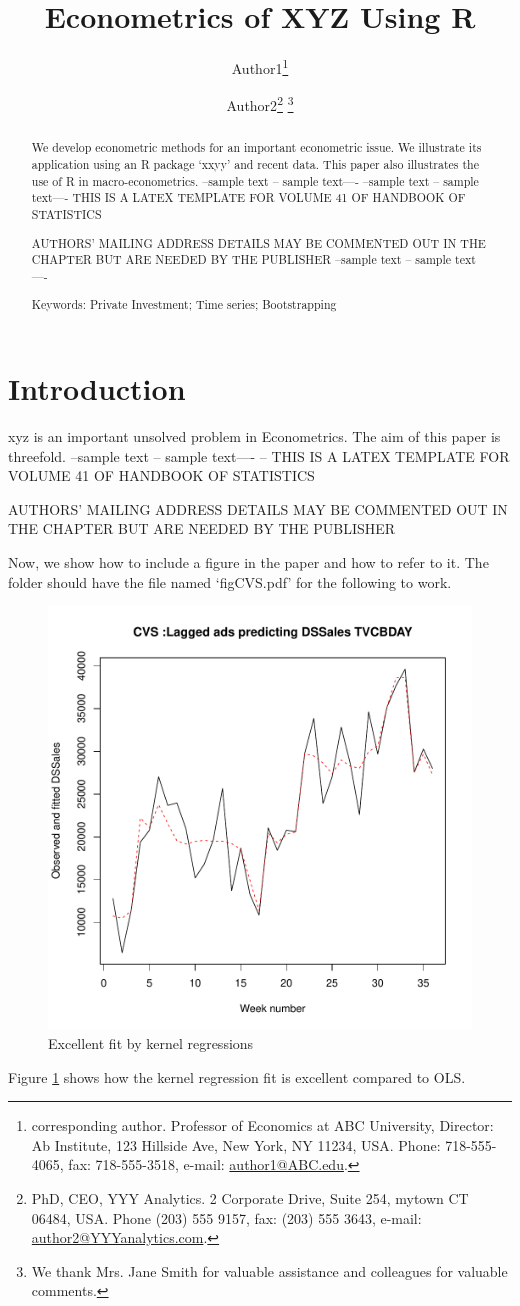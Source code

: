 \documentclass[12pt]{article}\usepackage[]{graphicx}\usepackage[]{color}
\title{Econometrics of XYZ Using R}
\author{ {Author1}\footnote{corresponding author. 
 Professor of Economics at ABC University, 
Director:  Ab Institute, 123 Hillside Ave, New York, NY 11234, USA. Phone: 718-555-4065, fax: 718-555-3518, e-mail: \url{author1@ABC.edu}.} 
\and 
{Author2}\footnote{PhD, CEO, YYY Analytics. 2 Corporate Drive, Suite 254, mytown CT 06484, USA. Phone (203) 555 9157, fax: (203) 555 3643, e-mail: \url{author2@YYYanalytics.com}.}
\thanks{We thank Mrs. Jane Smith for valuable assistance and colleagues for valuable comments.} 
} %
\begin{document}
\maketitle

\begin{abstract}
We develop econometric methods for an  important
econometric issue.
We illustrate its application using an R package `xxyy'
and recent data.
This paper also illustrates the use of R in macro-econometrics.
--sample text -- sample text----
--sample text -- sample text----
THIS IS A LATEX TEMPLATE FOR VOLUME 41 OF HANDBOOK OF STATISTICS


AUTHORS' MAILING ADDRESS DETAILS MAY BE COMMENTED OUT IN THE CHAPTER
 BUT ARE NEEDED BY THE PUBLISHER
 --sample text -- sample text----

\bigskip

Keywords: Private Investment; Time series; Bootstrapping


\end{abstract}

\section{Introduction}
xyz is an important unsolved problem in Econometrics.
The aim of this paper is threefold.
--sample text -- sample text----
--
THIS IS A LATEX TEMPLATE FOR VOLUME 41 OF HANDBOOK OF STATISTICS

AUTHORS' MAILING  ADDRESS DETAILS MAY BE COMMENTED OUT IN THE CHAPTER BUT ARE NEEDED BY THE PUBLISHER

Now, we show how to include a figure in the paper and
how to refer to it.  The folder should have the 
file named `figCVS.pdf' for the following to work.

\begin{figure}[ht!]
\centering 
\includegraphics[width=1\textwidth]{figCVS.pdf}
\caption{Excellent fit by kernel regressions}
\label{fig.fit}
\end{figure}
Figure  \ref{fig.fit} shows how the kernel regression fit is
excellent compared to OLS.
\end{document}
